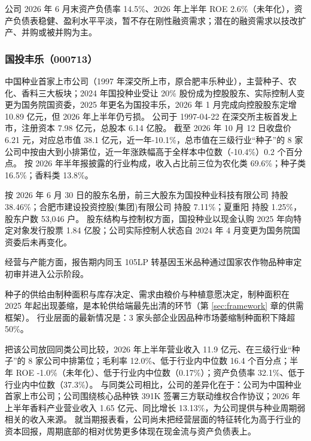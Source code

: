 公司 2026 年 6 月末资产负债率 14.5\%、2026 年上半年 ROE 2.6\%（未年化），资产负债表稳健、盈利水平平淡，暂不存在刚性融资需求；潜在的融资需求以技改扩产、并购或被并购为主。




\subsubsection{国投丰乐（000713）}
\label{co:000713}

 中国种业首家上市公司（1997 年深交所上市，原合肥丰乐种业），主营种子、农化、香料三大板块；2024 年国投种业受让 20\% 股份成为控股股东、实际控制人变更为国务院国资委，2025 年更名为国投丰乐，2026 年 1 月完成向控股股东定增 10.89 亿元，但 2026 年上半年仍亏损。 公司于 1997-04-22 在深交所主板首发上市，注册资本 7.98 亿元，总股本 6.14 亿股。 截至 2026 年 10 月 12 日收盘价 6.21 元，对应总市值 38.1 亿元，近一年-10.1\%，总市值在三级行业“种子”的 8 家公司中按由大到小排第位，近一年涨跌幅高于全样本中位数（-10.4\%）0.2 个百分点。 按 2026 年半年报披露的行业构成，收入占比前三位为农化类 69.6\%；种子类 16.5\%；香料类 13.8\%。

 按 2026 年 6 月 30 日的股东名册，前三大股东为国投种业科技有限公司 持股 38.46\%；合肥市建设投资控股(集团)有限公司 持股 7.11\%；夏重阳 持股 1.25\%，股东户数 53,046 户。 股东结构与控制权方面，国投种业以现金认购 2025 年向特定对象发行股票 1.84 亿股；公司实际控制人状态自 2024 年 4 月变更为国务院国资委后未再变化。

 经营与产能方面，报告期内同玉 105LP 转基因玉米品种通过国家农作物品种审定初审并进入公示阶段。

 种子的供给由制种面积与库存决定、需求由粮价与种植意愿决定，制种面积在 2025 年起出现萎缩，是本轮供给端最先出清的环节（第 \ref{sec:framework} 章的供需框架）。 行业层面的最新情况是：3 家头部企业因品种市场萎缩制种面积下降超 50\%。

 把该公司放回同类公司比较，2026 年上半年营业收入 11.9 亿元、在三级行业“种子”的 8 家公司中排第位；毛利率 12.0\%、低于行业内中位数 16.4 个百分点；半年 ROE -1.0\%（未年化）、低于行业内中位数（0.17\%）；资产负债率 32.1\%、低于行业内中位数（37.3\%）。 与同类公司相比，公司的差异化在于：公司为中国种业首家上市公司；公司围绕核心品种铁 391K 签署三方联动维权合作协议；2026 年上半年香料产业营业收入 1.65 亿元、同比增长 13.13\%，为公司提供与种业周期弱相关的收入来源。 就当期报表看，公司尚未把经营层面的特征转化为高于行业的资本回报，周期底部的相对优势更多体现在现金流与资产负债表上。

